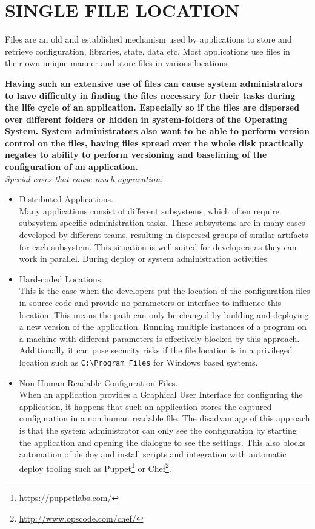 \newpage
\section*{SINGLE FILE LOCATION}
Files are an old and established mechanism used by applications to store and retrieve configuration, libraries, state, data etc. Most applications use files in their own unique manner and store files in various locations.
\begin{center}
  
\end{center}

\textbf{Having such an extensive use of files can cause system administrators to have difficulty in finding the files necessary for their tasks during the life cycle of an application. Especially so if the files are dispersed over different folders or hidden in system-folders of the Operating System. System administrators also want to be able to perform version control on the files, having files spread over the whole disk practically negates to ability to perform versioning and baselining of the configuration of an application.}\\

\textit{Special cases that cause much aggravation:}
\begin{itemize}
\item Distributed Applications.\\
Many applications consist of different subsystems, which often require  subsystem-specific administration tasks. These subsystems are in many cases developed by different teams, resulting in dispersed groups of similar artifacts for each subsystem. This situation is well suited for developers as they can work in parallel. During deploy or system administration activities.
\item Hard-coded Locations.\\
This is the case when the developers put the location of the configuration files in source code and provide no parameters or interface to influence this location. This means the path can only be changed by building and deploying a new version of the application. Running multiple instances of a program on a machine with different parameters is effectively blocked by this approach. Additionally it can pose security risks if the file location is in a privileged location such as \verb|C:\Program Files| for Windows based systems.
\item Non Human Readable Configuration Files.\\
When an application provides a Graphical User Interface for configuring the application, it happens that such an application stores the captured configuration in a non human readable file. The disadvantage of this approach is that the system administrator can only see the configuration by starting the application and opening the dialogue to see the settings. This also blocks automation of deploy and install scripts and integration with automatic deploy tooling such as Puppet\footnote{\url{https://puppetlabs.com/}} or Chef\footnote{\url{http://www.opscode.com/chef/}}.
\end{itemize}


